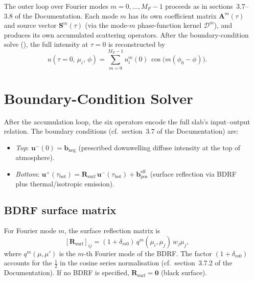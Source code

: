 \documentclass[11pt,a4paper]{article}
\newcommand{\vect}[1]{\bm{#1}}
\newcommand{\mat}[1]{\mathbf{#1}}
\newcommand{\tbot}{\tau_{\mathrm{bot}}}
\theoremstyle{definition}
\begin{document}
The outer loop over Fourier modes $m=0,\dots,M_F-1$ proceeds as
in sections~3.7--3.8 of the Documentation.  Each mode $m$ has its
own coefficient matrix $\mat{A}^m(\tau)$ and source vector
$\vect{S}^m(\tau)$ (via the mode-$m$ phase-function kernel
$\mathcal{D}^m$), and produces its own accumulated scattering
operators.  After the boundary-condition solve (),
the full intensity at $\tau=0$ is reconstructed by
\begin{equation}\label{eq:fourier_recon}
  u(\tau\!=\!0,\,\mu_i,\,\phi)
  = \sum_{m=0}^{M_F-1} u^m_i(0)\,\cos\bigl(m(\phi_0-\phi)\bigr).
\end{equation}


\section{Boundary-Condition Solver}\label{sec:bc_solver}

After the accumulation loop, the six operators encode the full slab's
input--output relation.  The boundary conditions
(cf.\ section~3.7 of the Documentation) are:
\begin{itemize}[nosep]
\item \emph{Top}: $\vect{u}^-(0)=\vect{b}_{\text{neg}}$
  (prescribed downwelling diffuse intensity at the top of atmosphere).
\item \emph{Bottom}: $\vect{u}^+(\tbot)=\mat{R}_{\text{surf}}\,
  \vect{u}^-(\tbot)+\vect{b}_{\text{pos}}^{\text{eff}}$
  (surface reflection via BDRF plus thermal/isotropic emission).
\end{itemize}

\subsection{BDRF surface matrix}

For Fourier mode $m$, the surface reflection matrix is
\begin{equation}\label{eq:R_surf}
  [\mat{R}_{\text{surf}}]_{ij}
  = (1+\delta_{m0})\,q^m(\mu_i,\mu_j)\,w_j\mu_j,
\end{equation}
where $q^m(\mu,\mu')$ is the $m$-th Fourier mode of the BDRF.  The
factor $(1+\delta_{m0})$ accounts for the $\frac{1}{2}$ in the cosine
series normalisation (cf.\ section~3.7.2 of the Documentation).
If no BDRF is specified, $\mat{R}_{\text{surf}}=\mat{0}$ (black
surface).
\end{document}
